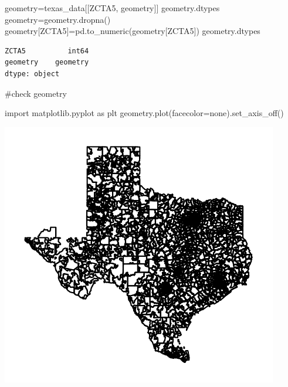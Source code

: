 \documentclass[
  letterpaper,
  DIV=11,
  numbers=noendperiod]{scrartcl}
\newenvironment{Shaded}{\begin{snugshade}}{\end{snugshade}}
\newcommand{\ImportTok}[1]{\textcolor[rgb]{0.00,0.46,0.62}{#1}}
\newcommand{\NormalTok}[1]{\textcolor[rgb]{0.00,0.23,0.31}{#1}}
\newcommand{\OperatorTok}[1]{\textcolor[rgb]{0.37,0.37,0.37}{#1}}
\newcommand{\StringTok}[1]{\textcolor[rgb]{0.13,0.47,0.30}{#1}}
\begin{document}
\begin{Shaded}
\begin{Highlighting}[]
\NormalTok{geometry}\OperatorTok{=}\NormalTok{texas\_data[[}\StringTok{\textquotesingle{}ZCTA5\textquotesingle{}}\NormalTok{, }\StringTok{\textquotesingle{}geometry\textquotesingle{}}\NormalTok{]]}
\NormalTok{geometry.dtypes}
\NormalTok{geometry}\OperatorTok{=}\NormalTok{geometry.dropna()}
\NormalTok{geometry[}\StringTok{\textquotesingle{}ZCTA5\textquotesingle{}}\NormalTok{]}\OperatorTok{=}\NormalTok{pd.to\_numeric(geometry[}\StringTok{\textquotesingle{}ZCTA5\textquotesingle{}}\NormalTok{])}
\NormalTok{geometry.dtypes}
\end{Highlighting}
\end{Shaded}

\begin{verbatim}
ZCTA5          int64
geometry    geometry
dtype: object
\end{verbatim}

\#check geometry

\begin{Shaded}
\begin{Highlighting}[]
\ImportTok{import}\NormalTok{ matplotlib.pyplot }\ImportTok{as}\NormalTok{ plt}
\NormalTok{geometry.plot(facecolor}\OperatorTok{=}\StringTok{\textquotesingle{}none\textquotesingle{}}\NormalTok{).set\_axis\_off()}
\end{Highlighting}
\end{Shaded}

\includegraphics{pset4_template_files/figure-pdf/cell-20-output-1.pdf}
\end{document}
